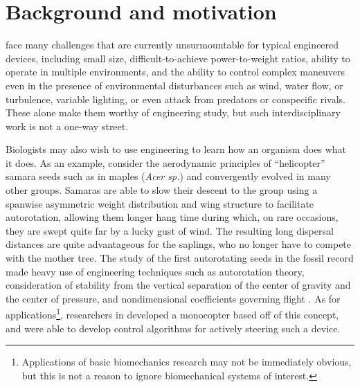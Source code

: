 \section{Background and motivation}\label{sec:background}
 face many challenges that are currently unsurmountable for typical engineered devices, including small size, difficult-to-achieve power-to-weight ratios, ability to operate in multiple environments, and the ability to control complex maneuvers even in the presence of environmental disturbances such as wind, water flow, or turbulence, variable lighting, or even attack from predators or conspecific rivals. These alone make them worthy of engineering study, but such interdisciplinary work is not a one-way street. 

Biologists may also wish to use engineering to learn how an organism does what it does.  As an example, consider the aerodynamic principles of ``helicopter'' samara seeds such as in maples (\emph{Acer sp.}) and convergently evolved in many other groups.  Samaras are able to slow their descent to the group using a spanwise asymmetric weight distribution and wing structure to facilitate autorotation, allowing them longer hang time during which, on rare occasions, they are swept quite far by a lucky gust of wind. The resulting long dispersal distances are quite advantageous for the saplings, who no longer have to compete with the mother tree. The study of the first autorotating seeds in the fossil record made heavy use of engineering techniques such as autorotation theory, consideration of stability from the vertical separation of the center of gravity and the center of pressure, and nondimensional coefficients governing flight \cite{stevenson2015when}.  As for applications\footnote{Applications of basic biomechanics research may not be immediately obvious, but this is not a reason to ignore biomechanical systems of interest.}, researchers in \cite{who2019maple} developed a monocopter based off of this concept, and were able to develop control algorithms for actively steering such a device. 

